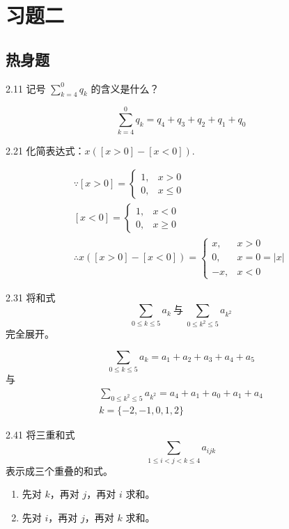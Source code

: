 \section{习题二}

\subsection{热身题}

\begin{problem}{2.1}{1}
  记号 \( \sum\limits_{k=4}^0 q_k \) 的含义是什么？
\end{problem}

\[
  \sum\limits_{k=4}^0 q_k = q_4 + q_3 + q_2 + q_1 + q_0
\]

\begin{problem}{2.2}{1}
  化简表达式：\( x([x>0]-[x<0]) \).
\end{problem}

\begin{gather*}
  \because [x > 0] =
  \begin{cases}
    1, & x > 0 \\
    0, & x \leq 0
  \end{cases} \\
  [x < 0] =
  \begin{cases}
    1, & x < 0 \\
    0, & x \geq 0
  \end{cases} \\
  \therefore x([x > 0] - [x < 0]) =
  \begin{cases}
    x, & x > 0 \\
    0, & x = 0 = |x| \\
    -x, & x < 0
  \end{cases}
\end{gather*}

\begin{problem}{2.3}{1}
  将和式
  \[
    \sum_{0 \leq k \leq 5} a_k \ \text{与} \ \sum_{0 \leq k^2 \leq 5} a_{k^2}
  \]
  完全展开。
\end{problem}

\[
  \sum_{0 \leq k \leq 5} a_k = a_1 + a_2 + a_3 + a_4 + a_5
\]
与
\begin{gather*}
  \sum_{0 \leq k^2 \leq 5} a_{k^2} = a_4 + a_1 + a_0 + a_1 + a_4 \\
  k = \{-2, -1, 0, 1, 2\}
\end{gather*}

\begin{problem}{2.4}{1}
  将三重和式
  \[
    \sum_{1 \leq i < j < k \leq 4} a_{ijk}
  \]
  表示成三个重叠的和式。
  \begin{enumerate}
    \item[a] 先对 \( k \)，再对 \( j \)，再对 \( i \) 求和。
    \item[b] 先对 \( i \)，再对 \( j \)，再对 \( k \) 求和。
  \end{enumerate}
\end{problem}


